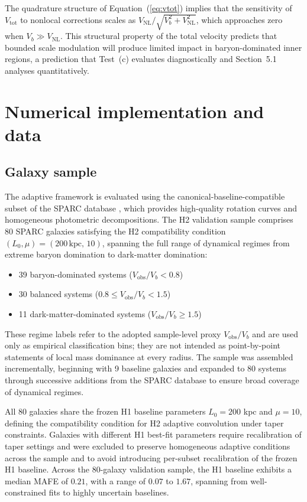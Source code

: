 \documentclass[twocolumn,linenumbers]{aastex701}
\newcommand{\Vobs}{V_{\mathrm{obs}}}
\begin{document}
The quadrature structure of Equation~(\ref{eq:vtot}) implies that the sensitivity
of $V_\mathrm{tot}$ to nonlocal corrections scales as
$V_\mathrm{NL}/\sqrt{V_b^2+V_\mathrm{NL}^2}$, which approaches zero when
$V_b \gg V_\mathrm{NL}$. This structural property of the total velocity
predicts that bounded scale modulation will produce limited impact in
baryon-dominated inner regions, a prediction that Test~(c) evaluates
diagnostically and Section~5.1 analyses quantitatively.

\section{Numerical implementation and data}

\subsection{Galaxy sample}

The adaptive framework is evaluated using the canonical-baseline-compatible
subset of the SPARC database \citep{lelli2016}, which provides high-quality
rotation curves and homogeneous photometric decompositions. The H2 validation
sample comprises 80 SPARC galaxies satisfying the H2 compatibility condition
$(L_0, \mu) = (200\,\mathrm{kpc},\,10)$, spanning the full range of dynamical
regimes from extreme baryon domination to dark-matter domination:

\begin{itemize}
	\item 39 baryon-dominated systems ($\Vobs/V_b < 0.8$)
	\item 30 balanced systems ($0.8 \leq \Vobs/V_b < 1.5$)
	\item 11 dark-matter-dominated systems ($\Vobs/V_b \geq 1.5$)
\end{itemize}
These regime labels refer to the adopted sample-level proxy $V_{\mathrm{obs}}/V_b$
and are used only as empirical classification bins; they are not intended as
point-by-point statements of local mass dominance at every radius.
The sample was assembled incrementally, beginning with 9 baseline galaxies
and expanded to 80 systems through successive additions from the SPARC
database to ensure broad coverage of dynamical regimes.

All 80 galaxies share the frozen H1 baseline parameters $L_0 = 200$ kpc
and $\mu = 10$, defining the compatibility condition for H2 adaptive
convolution under taper constraints. Galaxies with different H1 best-fit
parameters require recalibration of taper settings and were excluded to
preserve homogeneous adaptive conditions across the sample and to avoid
introducing per-subset recalibration of the frozen H1 baseline. Across the
80-galaxy validation sample, the H1 baseline exhibits a median MAFE of
$0.21$, with a range of $0.07$ to $1.67$, spanning from well-constrained
fits to highly uncertain baselines.
\end{document}
